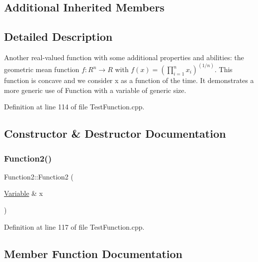 \subsection*{Additional Inherited Members}


\subsection{Detailed Description}
Another real-\/valued function with some additional properties and abilities\+: the geometric mean function $ f: R^n \rightarrow R $ with $ f(x) = \left(\prod_{i=1}^n x_i\right)^(1/n) $. This function is concave and we consider x as a function of the time. It demonstrates a more generic use of Function with a variable of generic size. 

Definition at line 114 of file Test\+Function.\+cpp.



\subsection{Constructor \& Destructor Documentation}
\hypertarget{classFunction2_ad907d2408853a2d278f87293abfcdf47}{}\label{classFunction2_ad907d2408853a2d278f87293abfcdf47} 
\subsubsection{\texorpdfstring{Function2()}{Function2()}}
{\footnotesize\ttfamily Function2\+::\+Function2 (\begin{DoxyParamCaption}\item[{\hyperlink{classocra_1_1Variable}{Variable} \&}]{x }\end{DoxyParamCaption})\hspace{0.3cm}{\ttfamily [inline]}}



Definition at line 117 of file Test\+Function.\+cpp.



\subsection{Member Function Documentation}
\hypertarget{classFunction2_ab05887e9f8995782cdc3f9399c476c4e}{}\label{classFunction2_ab05887e9f8995782cdc3f9399c476c4e} 
